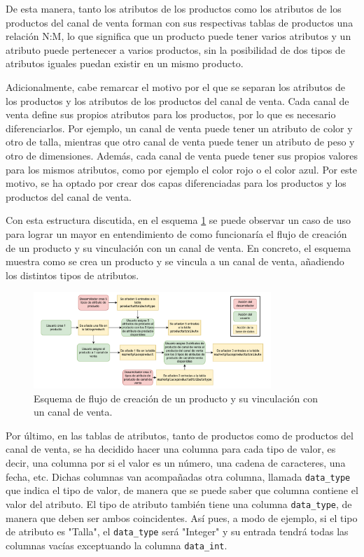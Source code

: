 De esta manera, tanto los atributos de los productos como los atributos de los productos del canal de venta forman con sus respectivas tablas de productos una relación N:M, lo que significa que un producto puede tener varios atributos y un atributo puede pertenecer a varios productos, sin la posibilidad de dos tipos de atributos iguales puedan existir en un mismo producto.

Adicionalmente, cabe remarcar el motivo por el que se separan los atributos de los productos y los atributos de los productos del canal de venta. Cada canal de venta define sus propios atributos para los productos, por lo que es necesario diferenciarlos. Por ejemplo, un canal de venta puede tener un atributo de color y otro de talla, mientras que otro canal de venta puede tener un atributo de peso y otro de dimensiones. Además, cada canal de venta puede tener sus propios valores para los mismos atributos, como por ejemplo el color rojo o el color azul. Por este motivo, se ha optado por crear dos capas diferenciadas para los productos y los productos del canal de venta.

Con esta estructura discutida, en el esquema \ref{fig:products_db_diagram} se puede observar un caso de uso para lograr un mayor en entendimiento de como funcionaría el flujo de creación de un producto y su vinculación con un canal de venta. En concreto, el esquema muestra como se crea un producto y se vincula a un canal de venta, añadiendo los distintos tipos de atributos.

\begin{figure}[H]
    \centering
    \includegraphics[width=0.8\textwidth]{figures/design_develop/products_db_diagram.pdf}
    \caption{Esquema de flujo de creación de un producto y su vinculación con un canal de venta.}
    \label{fig:products_db_diagram}
\end{figure}

Por último, en las tablas de atributos, tanto de productos como de productos del canal de venta, se ha decidido hacer una columna para cada tipo de valor, es decir, una columna por si el valor es un número, una cadena de caracteres, una fecha, etc. Dichas columnas van acompañadas otra columna, llamada \texttt{data\_type} que indica el tipo de valor, de manera que se puede saber que columna contiene el valor del atributo. El tipo de atributo también tiene una columna \texttt{data\_type}, de manera que deben ser ambos coincidentes. Así pues, a modo de ejemplo, si el tipo de atributo es "Talla", el \texttt{data\_type} será "Integer" y su entrada tendrá todas las columnas vacías exceptuando la columna \texttt{data\_int}.

